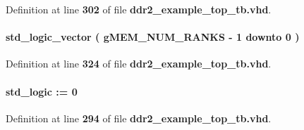 Definition at line {\bf 302} of file {\bf ddr2\+\_\+example\+\_\+top\+\_\+tb.\+vhd}.

\paragraph[{cke\+\_\+delayed}]{ {\bfseries \textcolor{comment}{std\+\_\+logic\+\_\+vector}\textcolor{vhdlchar}{ }\textcolor{vhdlchar}{(}\textcolor{vhdlchar}{ }\textcolor{vhdlchar}{ }\textcolor{vhdlchar}{ }\textcolor{vhdlchar}{ }{\bfseries {\bf g\+M\+E\+M\+\_\+\+N\+U\+M\+\_\+\+R\+A\+N\+KS}} \textcolor{vhdlchar}{-\/}\textcolor{vhdlchar}{ } \textcolor{vhdldigit}{1} \textcolor{vhdlchar}{ }\textcolor{keywordflow}{downto}\textcolor{vhdlchar}{ }\textcolor{vhdlchar}{ } \textcolor{vhdldigit}{0} \textcolor{vhdlchar}{ }\textcolor{vhdlchar}{)}\textcolor{vhdlchar}{ }} \hspace{0.3cm}{\ttfamily [Signal]}}\label{classddr2__example__top__tb_1_1rtl_a919b17997ea83098fbfbc422aaf805ca}


Definition at line {\bf 324} of file {\bf ddr2\+\_\+example\+\_\+top\+\_\+tb.\+vhd}.

\paragraph[{clk}]{ {\bfseries \textcolor{comment}{std\+\_\+logic}\textcolor{vhdlchar}{ }\textcolor{vhdlchar}{ }\textcolor{vhdlchar}{\+:}\textcolor{vhdlchar}{=}\textcolor{vhdlchar}{ }\textcolor{vhdlchar}{ }\textcolor{vhdlchar}{\textquotesingle{}}\textcolor{vhdlchar}{ } \textcolor{vhdldigit}{0} \textcolor{vhdlchar}{ }\textcolor{vhdlchar}{\textquotesingle{}}\textcolor{vhdlchar}{ }} \hspace{0.3cm}{\ttfamily [Signal]}}\label{classddr2__example__top__tb_1_1rtl_a80c6d2bedd6ee6dc3b651497f03af88c}


Definition at line {\bf 294} of file {\bf ddr2\+\_\+example\+\_\+top\+\_\+tb.\+vhd}.

